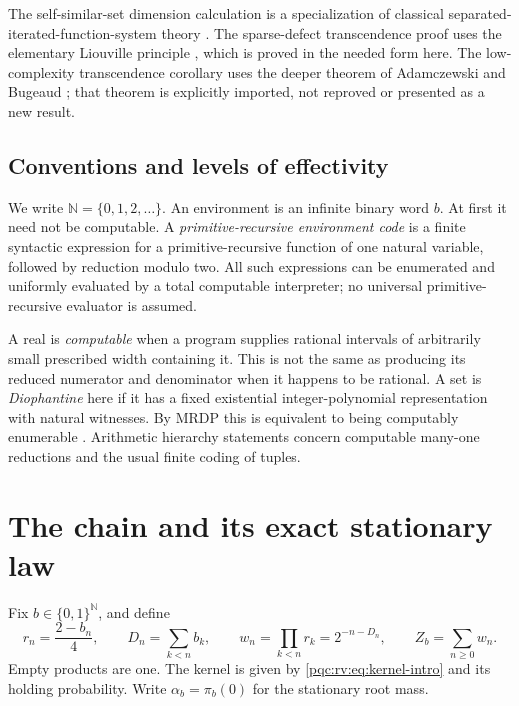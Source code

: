 \documentclass[11pt,letterpaper]{article}
\numberwithin{equation}{section}
\theoremstyle{definition}
\theoremstyle{remark}
\newcommand{\N}{\mathbb N}
\newcommand{\srcmark}[1]{\par\noindent{\small\itshape [source~#1]}\par}
\begin{document}
The self-similar-set dimension calculation is a specialization of
classical separated-iterated-function-system theory \cite{b62s17-hutchinson}.
The sparse-defect transcendence proof uses the elementary Liouville
principle \cite{b62s17-liouville}, which is proved in the needed form here.
The low-complexity transcendence corollary uses the deeper theorem of
Adamczewski and Bugeaud \cite{b62s17-ab}; that theorem is explicitly imported,
not reproved or presented as a new result.

\subsection{Conventions and levels of effectivity}
We write $\N=\{0,1,2,\ldots\}$. An environment is an infinite binary
word $b$. At first it need not be computable. A \emph{primitive-recursive
environment code} is a finite syntactic expression for a
primitive-recursive function of one natural variable, followed by
reduction modulo two. All such expressions can be enumerated and
uniformly evaluated by a total computable interpreter; no universal
primitive-recursive evaluator is assumed.

A real is \emph{computable} when a program supplies rational intervals
of arbitrarily small prescribed width containing it. This is not the
same as producing its reduced numerator and denominator when it happens
to be rational. A set is \emph{Diophantine} here if it has a fixed
existential integer-polynomial representation with natural witnesses.
By MRDP this is equivalent to being computably enumerable
\cite{b62s17-proveit-mrdp}. Arithmetic hierarchy statements concern computable
many-one reductions and the usual finite coding of tuples.

\section{The chain and its exact stationary law}
\label{pqc:rv:sec:stationary}
\srcmark{17}
Fix $b\in\{0,1\}^{\N}$, and define
\begin{equation}\label{pqc:rv:eq:weights}
 r_n=\frac{2-b_n}{4},\qquad D_n=\sum_{k<n}b_k,\qquad
 w_n=\prod_{k<n}r_k=2^{-n-D_n},\qquad Z_b=\sum_{n\geq0}w_n.
\end{equation}
Empty products are one. The kernel is given by
\cref{pqc:rv:eq:kernel-intro} and its holding probability. Write
$\alpha_b=\pi_b(0)$ for the stationary root mass.
\end{document}
